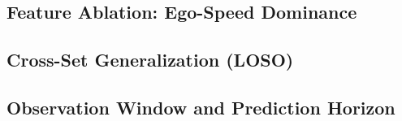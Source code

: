 \begin{table}[H]
\end{table}

\subsection{Feature Ablation: Ego-Speed Dominance}

\subsection{Cross-Set Generalization (LOSO)}

\subsection{Observation Window and Prediction Horizon}

